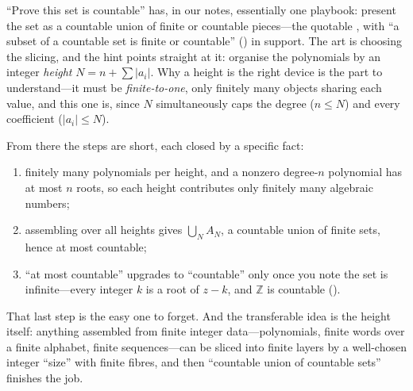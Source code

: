 \documentclass[main.tex]{subfiles}
\begin{document}
\begin{Reflection}
``Prove this set is countable'' has, in our notes, essentially one playbook: present the set as a
countable union of finite or countable pieces---the quotable , with ``a subset of a countable set is finite or countable''
() in support. The art is choosing the slicing, and the hint points straight at it:
organise the polynomials by an integer \emph{height} $N=n+\sum|a_i|$. Why a height is the right device
is the part to understand---it must be \emph{finite-to-one}, only finitely many objects sharing each
value, and this one is, since $N$ simultaneously caps the degree ($n\le N$) and every coefficient
($|a_i|\le N$).

From there the steps are short, each closed by a specific fact:
\begin{enumerate}[leftmargin=1.7em,itemsep=3pt,topsep=2pt,label=\textnormal{(\arabic*)}]
  \item finitely many polynomials per height, and a nonzero degree-$n$ polynomial has at most $n$
        roots, so each height contributes only finitely many algebraic numbers;
  \item assembling over all heights gives $\bigcup_N A_N$, a countable union of finite sets, hence at
        most countable;
  \item ``at most countable'' upgrades to ``countable'' only once you note the set is infinite---every
        integer $k$ is a root of $z-k$, and $\mathbb Z$ is countable ().
\end{enumerate}

That last step is the easy one to forget. And the transferable idea is the height itself: anything
assembled from finite integer data---polynomials, finite words over a finite alphabet, finite
sequences---can be sliced into finite layers by a well-chosen integer ``size'' with finite fibres, and
then ``countable union of countable sets'' finishes the job.
\end{Reflection}
\end{document}
